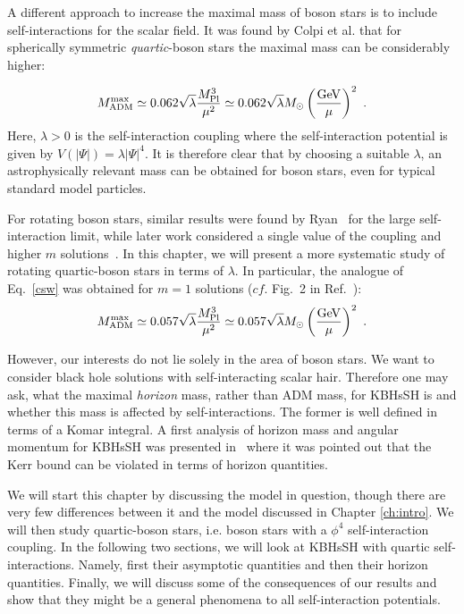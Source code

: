 A different approach to increase the maximal mass of boson stars is to include self-interactions for the scalar field.
It was found by Colpi et al.\cite{Colpi:1986ye} that for spherically symmetric \textit{quartic}-boson stars the maximal mass can be considerably higher:

\begin{equation}
 M_{\rm ADM}^{\rm max}\simeq 
0.062  \sqrt{\lambda}\frac{M_{\rm Pl}^3}{\mu^2}\simeq 0.062  \sqrt{\lambda}M_\odot \left(\frac{\rm GeV}{\mu}\right)^2\ .
\label{csw}
\end{equation}
Here, $\lambda>0$ is the self-interaction coupling where the self-interaction potential is given by $V(|\Psi|)=\lambda|\Psi|^4$.
It is therefore clear that by choosing a suitable $\lambda$, an astrophysically relevant mass can be obtained for boson stars, even for typical standard model particles.

For rotating boson stars, similar results were found by Ryan~\cite{Ryan:1996nk} for the large self-interaction limit, while later work considered a single value of the coupling and higher $m$ solutions~\cite{Grandclement:2014msa,Kleihaus:2015iea}.
In this chapter, we will present a more systematic study of rotating quartic-boson stars in terms of $\lambda$.
In particular, the analogue of Eq.~\eqref{csw} was obtained for $m=1$ solutions ($cf.$ Fig.~2 in Ref.~\cite{Herdeiro:2015tia}):
%
\begin{equation}
M_{\rm ADM}^{\rm max}\simeq 
0.057  \sqrt{\lambda}\frac{M_{\rm Pl}^3}{\mu^2}\simeq 0.057  \sqrt{\lambda}M_\odot \left(\frac{\rm GeV}{\mu}\right)^2\ .
\label{quartic_rotating}
\end{equation}

However, our interests do not lie solely in the area of boson stars.
We want to consider black hole solutions with self-interacting scalar hair.
Therefore one may ask, what the maximal \textit{horizon} mass, rather than ADM mass, for KBHsSH is and whether this mass is affected by self-interactions.
The former is well defined in terms of a Komar integral.
A first analysis of horizon mass and angular momentum for KBHsSH was presented in~\cite{Herdeiro:2015moa} where it was pointed out that the Kerr bound can be violated in terms of horizon quantities.

We will start this chapter by discussing the model in question, though there are very few differences between it and the model discussed in Chapter \ref{ch:intro}.
We will then study quartic-boson stars, i.e. boson stars with a $\phi^4$ self-interaction coupling.
In the following two sections, we will look at KBHsSH with quartic self-interactions.
Namely, first their asymptotic quantities and then their horizon quantities.
Finally, we will discuss some of the consequences of our results and show that they might be a general phenomena to all self-interaction potentials.

